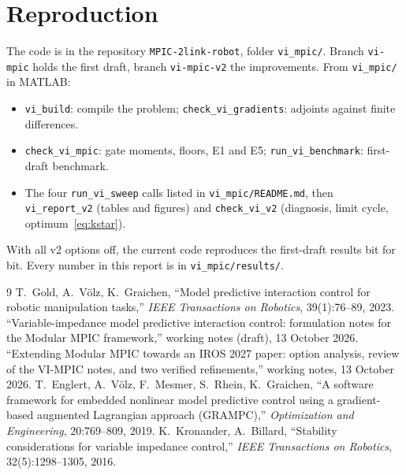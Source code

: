 \documentclass[11pt,a4paper]{article}
\begin{document}
\section{Reproduction}
The code is in the repository \texttt{MPIC-2link-robot}, folder \texttt{vi\_mpic/}. Branch
\texttt{vi-mpic} holds the first draft, branch \texttt{vi-mpic-v2} the improvements. From
\texttt{vi\_mpic/} in MATLAB:
\begin{itemize}[leftmargin=14pt]
\item \texttt{vi\_build}: compile the problem; \texttt{check\_vi\_gradients}: adjoints against finite
  differences.
\item \texttt{check\_vi\_mpic}: gate moments, floors, E1 and E5; \texttt{run\_vi\_benchmark}: first-draft
  benchmark.
\item The four \texttt{run\_vi\_sweep} calls listed in \texttt{vi\_mpic/README.md}, then
  \texttt{vi\_report\_v2} (tables and figures) and \texttt{check\_vi\_v2} (diagnosis, limit cycle,
  optimum~\eqref{eq:kstar}).
\end{itemize}
With all v2 options off, the current code reproduces the first-draft results bit for bit. Every number in
this report is in \texttt{vi\_mpic/results/}.

\begin{thebibliography}{9}
 T.~Gold, A.~V\"olz, K.~Graichen, ``Model predictive interaction control for robotic
manipulation tasks,'' \emph{IEEE Transactions on Robotics}, 39(1):76--89, 2023.
 ``Variable-impedance model predictive interaction control: formulation notes for the
Modular MPIC framework,'' working notes (draft), 13 October 2026.
 ``Extending Modular MPIC towards an IROS 2027 paper: option analysis, review of the
VI-MPIC notes, and two verified refinements,'' working notes, 13 October 2026.
 T.~Englert, A.~V\"olz, F.~Mesmer, S.~Rhein, K.~Graichen, ``A software framework for
embedded nonlinear model predictive control using a gradient-based augmented Lagrangian approach
(GRAMPC),'' \emph{Optimization and Engineering}, 20:769--809, 2019.
 K.~Kronander, A.~Billard, ``Stability considerations for variable impedance
control,'' \emph{IEEE Transactions on Robotics}, 32(5):1298--1305, 2016.
\end{thebibliography}
\end{document}
